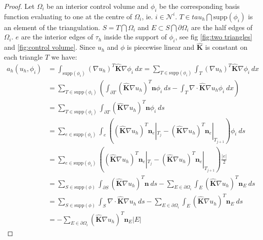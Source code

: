 \documentclass[../Main/main.tex]{subfiles}
\begin{document}
	\begin{proof}
			\item Let $\Omega_i$ be an interior control volume and $\phi_i$ be the corresponding basis function evaluating to one at the centre of $\Omega_i$, ie. $i \in \mathcal{N}^i$. $T \in tau_h \bigcap \text{supp}(\phi_i)$ is an element of the triangulation. $S=T\bigcap \Omega_i$ and $E \subset S\bigcap \partial \Omega_i$ are the half edges of $\Omega_i$. $e$ are the interior edges of $\tau_h$ inside the support of $\phi_i$, see fig \ref{fig:two triangles} and \ref{fig:control volume}. Since $u_h$ and $\phi$ is piecewise linear and $\pmb{\hat{K}}$ is constant on each triangle $T$ we have:
			\begin{equation}\label{eq:big computation}
				\begin{aligned}
					a_h(u_h,\phi_i) &= \int_{\text{supp}(\phi_i)} (\nabla u_h)^T \pmb{\hat{K}}\nabla \phi_i \ dx = \sum_{T\in \text{supp}(\phi_i)} \int_T (\nabla u_h)^T \pmb{\hat{K}}\nabla \phi_i \ dx \\
					&= \sum_{T\in \text{supp}(\phi_i)} \left ( \int_{\partial T} (\pmb{\hat{K}}\nabla u_h)^T \pmb{n}\phi_i \ ds-\int_T \nabla \cdot \pmb{\hat{K}} \nabla u_h \phi_i \ dx \right ) \\
					&=\sum_{T\in \text{supp}(\phi_i)}\int_{\partial T} (\pmb{\hat{K}}\nabla u_h)^T \pmb{n}\phi_i \ ds \\
					&= \sum_{e\in \text{supp}(\phi_i)} \int_e ((\pmb{\hat{K}}\nabla u_h)^T \pmb{n}_e|_{T_{j}} - (\pmb{\hat{K}}\nabla u_h)^T \pmb{n}_e|_{T_{j+1}})\phi_i \ ds\\
					&= \sum_{e\in \text{supp}(\phi_i)}
					((\pmb{\hat{K}}\nabla u_h)^T \pmb{n}_e|_{T_{j}} - (\pmb{\hat{K}}\nabla u_h)^T \pmb{n}_e|_{T_{j+1}}) \frac{|e|}{2}\\
					&=\sum_{S\in \text{supp}(\phi)}\int_{\partial S}  (\pmb{\hat{K}}\nabla u_h)^T \pmb{n} \ ds - \sum_{E\in \partial \Omega_i}\int_E (\pmb{\hat{K}}\nabla u_h)^T \pmb{n}_E \ ds\\
					&= \sum_{S\in \text{supp}(\phi)}\int_{ S} \nabla \cdot \pmb{\hat{K}}\nabla u_h \ ds - \sum_{E\in \partial \Omega_i}\int_E (\pmb{\hat{K}}\nabla u_h)^T \pmb{n}_E \ ds\\
					&=- \sum_{E\in \partial \Omega_i} (\pmb{\hat{K}}\nabla u_h)^T \pmb{n}_E |E| 
				\end{aligned}
			\end{equation}
	\end{proof}
\end{document}

